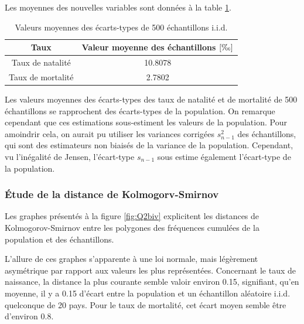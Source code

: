 \documentclass[a4paper, 12pt]{article}
\begin{document}
	Les moyennes des nouvelles variables sont données à la table \ref{tab:Q2biii}.
	
	\begin{table}[!ht]
	    \centering
	     \begin{tabular}{|c|c|}
	        \hline
	        \textbf{Taux} & \textbf{Valeur moyenne des échantillons} \(\left [\text{\textperthousand} \right ]\)\\ \hline
	        \hline
	        Taux de natalité & \num{10.8078}\\ \hline
	        Taux de mortalité & \num{2.7802}\\ \hline
	    \end{tabular}
	    \caption{Valeurs moyennes des écarts-types de 500 échantillons i.i.d.}
	    \label{tab:Q2biii}
	\end{table}
	
	Les valeurs moyennes des écarts-types des taux de natalité et de mortalité de \num{500} échantillons se rapprochent des écarts-types de la population. On remarque cependant que ces estimations sous-estiment les valeurs de la population. Pour amoindrir cela, on aurait pu utiliser les variances corrigées \(s^2_{n-1}\) des échantillons, qui sont des estimateurs non biaisés de la variance de la population. Cependant, vu l'inégalité de Jensen, l'écart-type \(s_{n-1}\) sous estime également l'écart-type de la population.
	
	\subsubsection{Étude de la distance de Kolmogorv-Smirnov}
	Les graphes présentés à la figure \ref{fig:Q2biv} explicitent les distances de Kolmogorov-Smirnov entre les polygones des fréquences cumulées de la population et des échantillons.\par
	
	L'allure de ces graphes s'apparente à une loi normale, mais légèrement asymétrique par rapport aux valeurs les plus représentées. Concernant le taux de naissance, la distance la plus courante semble valoir environ \num{0.15}, signifiant, qu'en moyenne, il y a \num{0.15} d'écart entre la population et un échantillon aléatoire i.i.d. quelconque de \num{20} pays. Pour le taux de mortalité, cet écart moyen semble être d'environ \num{0.8}.
	
\end{document}
